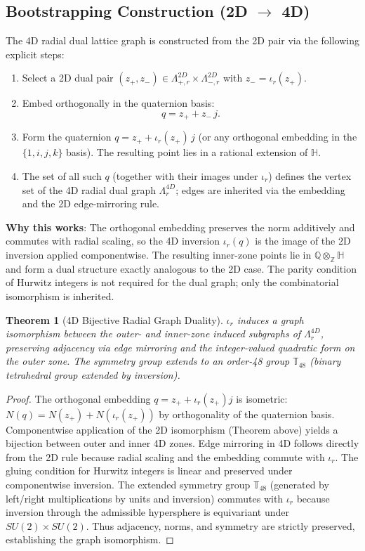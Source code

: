 \documentclass{article}
\newtheorem{theorem}{Theorem}
\begin{document}
\subsection{Bootstrapping Construction (2D \(\to\) 4D)}
The 4D radial dual lattice graph is constructed from the 2D pair via the following explicit steps:
\begin{enumerate}
  \item Select a 2D dual pair \((z_+, z_-) \in \Lambda_{+,r}^{2D} \times \Lambda_{-,r}^{2D}\) with \(z_- = \iota_r(z_+)\).
  \item Embed orthogonally in the quaternion basis:
        \[
        q = z_+ + z_- \, j.
        \]
  \item Form the quaternion \(q = z_+ + \iota_r(z_+) \, j\) (or any orthogonal embedding in the \(\{1,i,j,k\}\) basis). The resulting point lies in a rational extension of \(\mathbb{H}\).
  \item The set of all such \(q\) (together with their images under \(\iota_r\)) defines the vertex set of the 4D radial dual graph \(\Lambda_r^{4D}\); edges are inherited via the embedding and the 2D edge-mirroring rule.
\end{enumerate}
\textbf{Why this works}: The orthogonal embedding preserves the norm additively and commutes with radial scaling, so the 4D inversion \(\iota_r(q)\) is the image of the 2D inversion applied componentwise. The resulting inner-zone points lie in \(\mathbb{Q} \otimes_{\mathbb{Z}} \mathbb{H}\) and form a dual structure exactly analogous to the 2D case. The parity condition of Hurwitz integers is not required for the dual graph; only the combinatorial isomorphism is inherited.
\begin{theorem}[4D Bijective Radial Graph Duality]
\(\iota_r\) induces a graph isomorphism between the outer- and inner-zone induced subgraphs of \(\Lambda_r^{4D}\), preserving adjacency via edge mirroring and the integer-valued quadratic form on the outer zone. The symmetry group extends to an order-48 group \(\mathbb{T}_{48}\) (binary tetrahedral group extended by inversion).
\end{theorem}
\begin{proof}
The orthogonal embedding \(q = z_+ + \iota_r(z_+) j\) is isometric: \(N(q) = N(z_+) + N(\iota_r(z_+))\) by orthogonality of the quaternion basis. Componentwise application of the 2D isomorphism (Theorem above) yields a bijection between outer and inner 4D zones. Edge mirroring in 4D follows directly from the 2D rule because radial scaling and the embedding commute with \(\iota_r\). The gluing condition for Hurwitz integers is linear and preserved under componentwise inversion. The extended symmetry group \(\mathbb{T}_{48}\) (generated by left/right multiplications by units and inversion) commutes with \(\iota_r\) because inversion through the admissible hypersphere is equivariant under \(SU(2) \times SU(2)\). Thus adjacency, norms, and symmetry are strictly preserved, establishing the graph isomorphism.
\end{proof}
\end{document}

